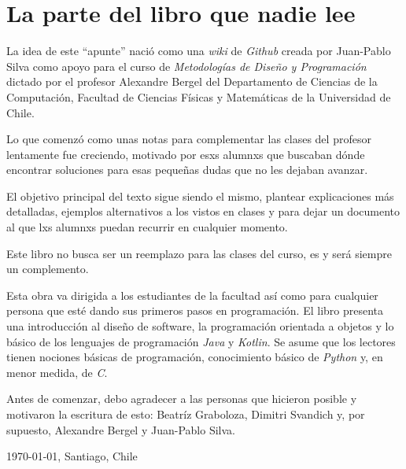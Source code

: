 \chapter*{La parte del libro que nadie lee}
  La idea de este \enquote{apunte} nació como una \textit{wiki} de \textit{Github} creada por 
  Juan-Pablo Silva como apoyo para el curso de \textit{Metodologías de Diseño y Programación} 
  dictado por el profesor Alexandre Bergel del Departamento de Ciencias de la Computación, Facultad
  de Ciencias Físicas y Matemáticas de la Universidad de Chile.

  Lo que comenzó como unas notas para complementar las clases del profesor lentamente fue creciendo,
  motivado por esxs alumnxs que buscaban dónde encontrar soluciones para esas pequeñas dudas que no
  les dejaban avanzar.

  El objetivo principal del texto sigue siendo el mismo, plantear explicaciones más detalladas, 
  ejemplos alternativos a los vistos en clases y para dejar un documento al que lxs alumnxs puedan
  recurrir en cualquier momento.

  Este libro no busca ser un reemplazo para las clases del curso, es y será siempre un complemento.

  Esta obra va dirigida a los estudiantes de la facultad así como para cualquier persona que esté
  dando sus primeros pasos en programación.
  El libro presenta una introducción al diseño de software, la programación orientada a objetos y lo
  básico de los lenguajes de programación \textit{Java} y \textit{Kotlin}.
  Se asume que los lectores tienen nociones básicas de programación, conocimiento básico de 
  \textit{Python} y, en menor medida, de \textit{C}.

  Antes de comenzar, debo agradecer a las personas que hicieron posible y motivaron la escritura de
  esto: Beatríz Graboloza, Dimitri Svandich y, por supuesto, Alexandre Bergel y Juan-Pablo Silva.

  \begin{center}
    \today, Santiago, Chile
  \end{center}